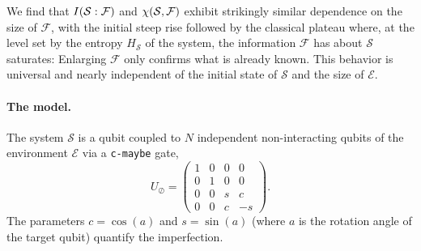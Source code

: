 \documentclass[aps,prl,showpacs,amsmath,amssymb,amsfonts,lengthcheck,twocolumn,longbibliography,superscriptaddress]{revtex4-2}
\newcommand{\cS}        {{\mathcal S}}
\newcommand{\cE}        {{\mathcal E}}
\newcommand{\+}         {\dagger}
\newcommand\cF{{\mathcal F}}
\newcommand{\mc}[1]{\mathcal{#1}}
\begin{document}

We find that $I({\cal S} : {\cal F})$ and $\chi({\cal S}, {\cal F})$ exhibit strikingly similar dependence on the size of $\cF$, with the initial steep rise followed by the classical plateau where, at the level set by the entropy $H_\cS$ of the system, the information $\cF$ has about $\cS$ saturates: Enlarging $\cF$ 
only confirms what is already known.  This behavior is universal and nearly independent of the initial state of $\mc{S}$ and the size of $\cE$.

\paragraph*{The model.}

The system $\mc{S}$ is a qubit coupled to $N$ independent non-interacting qubits of the environment  $\mc{E}$ via a {\tt c-maybe} gate,
\begin{equation}
U_{\oslash}=\begin{pmatrix}
1 & 0 & 0 & 0 \\
0 & 1 & 0 & 0 \\
0 & 0 & s & c \\
0 & 0 & c & -s
\end{pmatrix}.
\label{ope}
\end{equation}
The parameters $c=\cos(a)$ and $s=\sin(a)$ (where $a$ is the rotation angle of the target qubit) 
quantify the imperfection.
\end{document}
